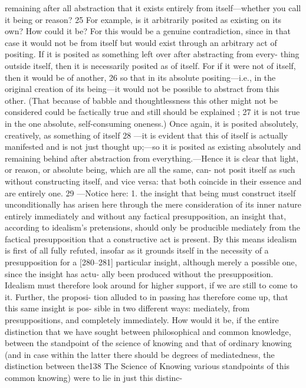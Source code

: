 remaining after all abstraction that it exists entirely from itself—whether you
call it being or reason? 25 For example, is it arbitrarily posited as existing on its
own? How could it be? For this would be a genuine contradiction, since in that
case it would not be from itself but would exist through an arbitrary act of
positing. If it is posited as something left over after abstracting from every-
thing outside itself, then it is necessarily posited as of itself. For if it were not
of itself, then it would be of another, 26 so that in its absolute positing—i.e., in
the original creation of its being—it would not be possible to abstract from
this other. (That because of babble and thoughtlessness this other might not
be considered could be factically true and still should be explained ; 27 it is not
true in the one absolute, self-consuming oneness.) Once again, it is posited
absolutely, creatively, as something of itself 28 —it is evident that this of itself is
actually manifested and is not just thought up;—so it is posited as existing
absolutely and remaining behind after abstraction from everything.—Hence
it is clear that light, or reason, or absolute being, which are all the same, can-
not posit itself as such without constructing itself, and vice versa: that both
coincide in their essence and are entirely one. 29 —Notice here: 1. the insight
that being must construct itself unconditionally has arisen here through the
mere consideration of its inner nature entirely immediately and without any
factical presupposition, an insight that, according to idealism’s pretensions,
should only be producible mediately from the factical presupposition that a
constructive act is present. By this means idealism is first of all fully refuted,
insofar as it grounds itself in the necessity of a presupposition for a [280–281]
particular insight, although merely a possible one, since the insight has actu-
ally been produced without the presupposition. Idealism must therefore look
around for higher support, if we are still to come to it. Further, the proposi-
tion alluded to in passing has therefore come up, that this same insight is pos-
sible in two different ways: mediately, from presuppositions, and completely
immediately. How would it be, if the entire distinction that we have sought
between philosophical and common knowledge, between the standpoint of
the science of knowing and that of ordinary knowing (and in case within the
latter there should be degrees of mediatedness, the distinction between the138
The Science of Knowing
various standpoints of this common knowing) were to lie in just this distinc-
